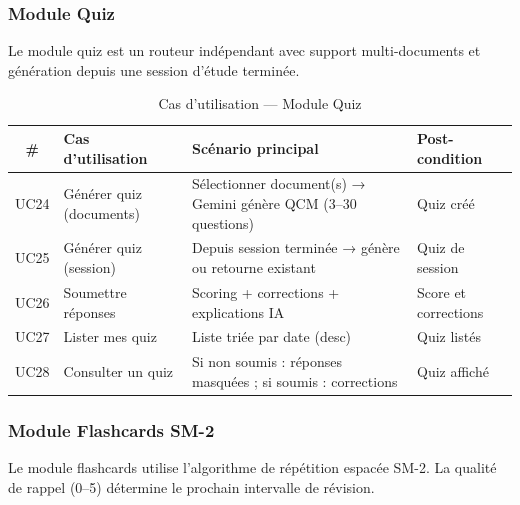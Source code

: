 \documentclass[12pt,a4paper]{report}
\begin{document}
\subsubsection{Module Quiz}

Le module quiz est un routeur indépendant avec support multi-documents et génération depuis une session d'étude terminée.

\begin{table}[H]
    \centering
    \caption{Cas d'utilisation — Module Quiz}
    \renewcommand{\arraystretch}{1.3}
    \begin{tabular}{|c|p{3.5cm}|p{4.5cm}|p{3.5cm}|}
        \hline
        \textbf{\#} & \textbf{Cas d'utilisation} & \textbf{Scénario principal} & \textbf{Post-condition} \\
        \hline
        UC24 & Générer quiz (documents) & Sélectionner document(s) → Gemini génère QCM (3–30 questions) & Quiz créé \\
        \hline
        UC25 & Générer quiz (session) & Depuis session terminée → génère ou retourne existant & Quiz de session \\
        \hline
        UC26 & Soumettre réponses & Scoring + corrections + explications IA & Score et corrections \\
        \hline
        UC27 & Lister mes quiz & Liste triée par date (desc) & Quiz listés \\
        \hline
        UC28 & Consulter un quiz & Si non soumis : réponses masquées ; si soumis : corrections & Quiz affiché \\
        \hline
    \end{tabular}
\end{table}

\subsubsection{Module Flashcards SM-2}

Le module flashcards utilise l'algorithme de répétition espacée SM-2. La qualité de rappel (0–5) détermine le prochain intervalle de révision.
\end{document}
